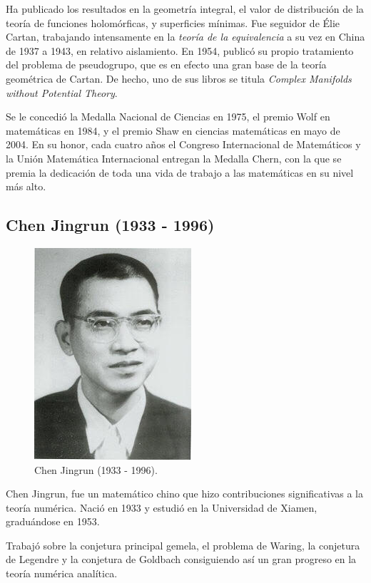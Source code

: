 \documentclass[a4paper, 11pt]{article}
\begin{document}
		Ha publicado los resultados en la geometría integral, el valor de distribución de la teoría de funciones
		holomórficas, y superficies mínimas. Fue seguidor de Élie Cartan, trabajando intensamente en la \textit{teoría
		de la equivalencia} a su vez en China de 1937 a 1943, en relativo aislamiento. En 1954, publicó su propio
		tratamiento del problema de pseudogrupo, que es en efecto una gran base de la teoría geométrica de Cartan.
		De hecho, uno de sus libros se titula \textit{Complex Manifolds without Potential Theory}.
		
		Se le concedió la Medalla Nacional de Ciencias en 1975, el premio Wolf en matemáticas en 1984, y el premio Shaw
		en ciencias matemáticas en mayo de 2004. En su honor, cada cuatro años el Congreso Internacional de Matemáticos y
		la Unión Matemática Internacional entregan la Medalla Chern, con la que se premia la dedicación de toda una vida
		de trabajo a las matemáticas en su nivel más alto.
			
	\subsection{Chen Jingrun (1933 - 1996)}
		\begin{figure}[!ht]
			\centering
			\includegraphics{chen_jingrun.jpg}
			\caption{Chen Jingrun (1933 - 1996).}
			\label{fig:chen_jingrun}
		\end{figure}

		Chen Jingrun, fue un matemático chino que hizo contribuciones significativas a la teoría numérica. Nació en 1933
		y estudió en la Universidad de Xiamen, graduándose en 1953.
		
		Trabajó sobre la conjetura principal gemela, el problema de Waring, la conjetura de Legendre y la conjetura de
		Goldbach consiguiendo así un gran progreso en la teoría numérica analítica.
		
\end{document}
